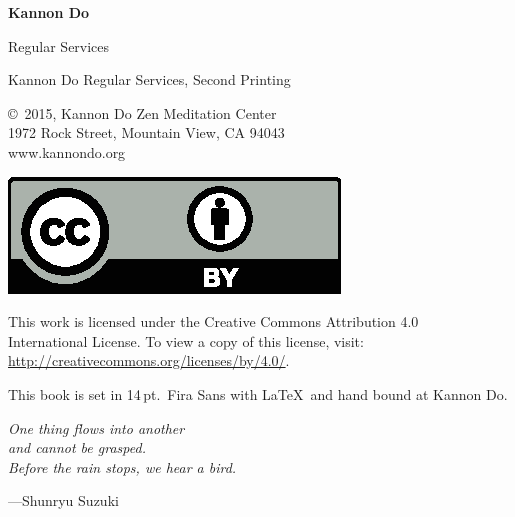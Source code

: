 \documentclass{kdo}
\begin{document}

\frontmatter
\begin{titlepage}
{\Huge\bf Kannon Do

  \bigskip\bigskip

 Regular Services}
\end{titlepage}

\begin{colophon}
Kannon Do Regular Services, Second Printing

\bigskip

\copyright\ 2015, Kannon Do Zen Meditation Center\\
1972 Rock Street, Mountain View, CA 94043\\
www.kannondo.org

\includegraphics{by}

This work is licensed under the Creative Commons Attribution 4.0\\
International License. To view a copy of this license, visit:\\
\url{http://creativecommons.org/licenses/by/4.0/}.

\bigskip

This book is set in 14\,pt.\ Fira Sans with \LaTeX\ and hand bound at Kannon Do.
\end{colophon}

\begin{dedication}
\em
\setlength{\parskip}{18pt plus 2pt}
One thing flows into another\\
and cannot be grasped.\\
Before the rain stops, we hear a bird.

---Shunryu Suzuki
\end{dedication}

\cleardoublepage

\tableofcontents
\end{document}
